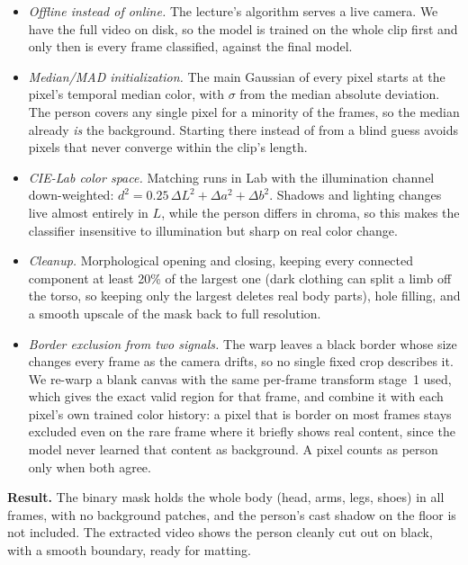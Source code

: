\documentclass[11pt]{article}
\begin{document}
\begin{itemize}[nosep]
    \item \emph{Offline instead of online.} The lecture's algorithm serves a live camera. We
    have the full video on disk, so the model is trained on the whole clip first and only then
    is every frame classified, against the final model.
    \item \emph{Median/MAD initialization.} The main Gaussian of every pixel starts at the
    pixel's temporal median color, with $\sigma$ from the median absolute deviation. The person
    covers any single pixel for a minority of the frames, so the median already \emph{is} the
    background. Starting there instead of from a blind guess avoids pixels that never converge
    within the clip's length.
    \item \emph{CIE-Lab color space.} Matching runs in Lab with the illumination channel
    down-weighted: $d^2 = 0.25\,\Delta L^2 + \Delta a^2 + \Delta b^2$. Shadows and lighting
    changes live almost entirely in $L$, while the person differs in chroma, so this makes the
    classifier insensitive to illumination but sharp on real color change.
    \item \emph{Cleanup.} Morphological opening and closing,
    keeping every connected component at least 20\% of the largest one (dark clothing can split
    a limb off the torso, so keeping only the largest deletes real body parts), hole filling, and a
    smooth upscale of the mask back to full resolution.
    \item \emph{Border exclusion from two signals.} The warp leaves a black border whose size
    changes every frame as the camera drifts, so no single fixed crop describes it. We re-warp a
    blank canvas with the same per-frame transform stage~1 used, which gives the exact valid
    region for that frame, and combine it with each pixel's own trained color history: a pixel
    that is border on most frames stays excluded even on the rare frame where it briefly shows
    real content, since the model never learned that content as background. A pixel counts as
    person only when both agree.
\end{itemize}

\noindent
\textbf{Result.} The binary mask holds the whole body (head, arms, legs, shoes) in
all frames, with no background patches, and the person's cast shadow on the floor is not
included. The extracted video shows the person cleanly cut out on black, with a smooth boundary,
ready for matting.
\end{document}
